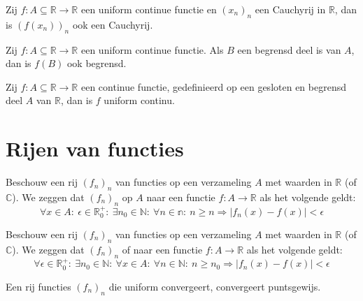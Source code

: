 \documentclass[main.tex]{subfiles}
\begin{document}
\begin{pr}
  Zij $f: A \subseteq \mathbb{R} \rightarrow \mathbb{R}$ een uniform continue functie en $(x_{n})_{n}$ een Cauchyrij in $\mathbb{R}$, dan is $(f(x_{n}))_{n}$ ook een Cauchyrij.
\end{pr}

\begin{pr}
  Zij $f: A \subseteq \mathbb{R} \rightarrow \mathbb{R}$ een uniform continue functie.
  Als $B$ een begrensd deel is van $A$, dan is $f(B)$ ook begrensd.
\end{pr}

\begin{st}
  Zij $f: A \subseteq \mathbb{R} \rightarrow \mathbb{R}$ een continue functie, gedefinieerd op een gesloten en begrensd deel $A$ van $\mathbb{R}$, dan is $f$ uniform continu.
\end{st}

\section{Rijen van functies}
\label{sec:rijen-van-functies}

\begin{de}
  Beschouw een rij $(f_{n})_{n}$ van functies op een verzameling $A$ met waarden in $\mathbb{R}$ (of $\mathbb{C}$).
  We zeggen dat $(f_{n})_{n}$  op $A$ naar een functie $f: A \rightarrow \mathbb{R}$ als het volgende geldt:
  \[ \forall x\in A:\ \epsilon \in \mathbb{R}_{0}^{+}:\ \exists n_{0}\in \mathbb{N}:\ \forall n\in \mathbb{n}:\ n \ge n \Rightarrow |f_{n}(x)-f(x)| < \epsilon \]
\end{de}

\begin{de}
  Beschouw een rij $(f_{n})_{n}$ van functies op een verzameling $A$ met waarden in $\mathbb{R}$ (of $\mathbb{C}$).
  We zeggen dat $(f_{n})_{n}$  of  naar een functie $f: A \rightarrow \mathbb{R}$ als het volgende geldt:
  \[ \forall \epsilon \in \mathbb{R}_{0}^{+}:\ \exists n_{0} \in \mathbb{N}:\ \forall x \in A:\ \forall n\in \mathbb{N}:\ n \ge n_{0} \Rightarrow |f_{n}(x)-f(x)| < \epsilon \]
\end{de}

\begin{st}
  Een rij functies $(f_{n})_{n}$ die uniform convergeert, convergeert puntsgewijs.
\end{st}
\end{document}
